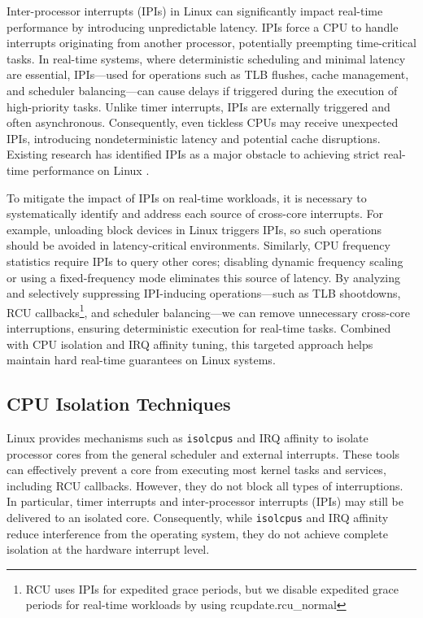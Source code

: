 \documentclass[letterpaper]{article}
\begin{document}
Inter-processor interrupts (IPIs) in Linux can significantly impact real-time performance by introducing 
unpredictable latency. IPIs force a CPU to handle interrupts originating from another processor, 
potentially preempting time-critical tasks. In real-time systems, where deterministic scheduling and 
minimal latency are essential, IPIs—used for operations such as TLB flushes, cache management, 
and scheduler balancing—can cause delays if triggered during the execution of high-priority tasks. 
Unlike timer interrupts, IPIs are externally triggered and often asynchronous. Consequently, even 
tickless CPUs may receive unexpected IPIs, introducing nondeterministic latency and potential cache 
disruptions. Existing research has identified IPIs as a major obstacle to achieving strict real-time 
performance on Linux \cite{YuxinRen}.  

To mitigate the impact of IPIs on real-time workloads, it is necessary to systematically identify and 
address each source of cross-core interrupts. For example, unloading block devices in Linux triggers 
IPIs, so such operations should be avoided in latency-critical environments. Similarly, CPU frequency 
statistics require IPIs to query other cores; disabling dynamic frequency scaling or using a fixed-frequency 
mode eliminates this source of latency. By analyzing and selectively suppressing IPI-inducing operations—such as 
TLB shootdowns, RCU callbacks\footnote{RCU uses IPIs for expedited grace periods, but we disable expedited
grace periods for real-time workloads by using rcupdate.rcu\_normal},
and scheduler balancing—we can remove unnecessary cross-core interruptions, 
ensuring deterministic execution for real-time tasks. Combined with CPU isolation and IRQ affinity tuning, 
this targeted approach helps maintain hard real-time guarantees on Linux systems.



\subsection{CPU Isolation Techniques}

Linux provides mechanisms such as \texttt{isolcpus} and IRQ affinity \cite{KernelDocParam} 
to isolate processor cores from the general scheduler and external interrupts. 
These tools can effectively prevent a core from executing most kernel tasks and services, 
including RCU callbacks. However, they do not block all types of interruptions. 
In particular, timer interrupts and inter-processor interrupts (IPIs) may still be delivered 
to an isolated core. Consequently, while \texttt{isolcpus} and IRQ affinity reduce interference 
from the operating system, they do not achieve complete isolation at the hardware interrupt level.  
\end{document}
